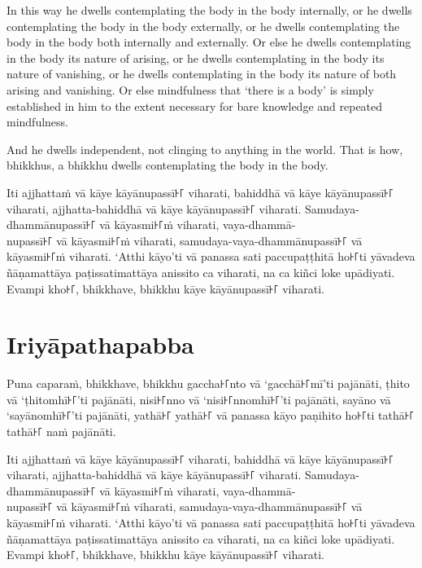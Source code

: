 In this way he dwells contemplating the body in the body internally, or he
dwells contemplating the body in the body externally, or he dwells contemplating
the body in the body both internally and externally. Or else he dwells
contemplating in the body its nature of arising, or he dwells contemplating in
the body its nature of vanishing, or he dwells contemplating in the body its
nature of both arising and vanishing. Or else mindfulness that ‘there is a body’
is simply established in him to the extent necessary for bare knowledge and
repeated mindfulness.

And he dwells independent, not clinging to anything in the world. That is how,
bhikkhus, a bhikkhu dwells contemplating the body in the body.


\paliPage

Iti ajjhattaṁ vā kāye kāyānupassī꜔꜒ viharati, bahiddhā vā kāye kāyānupassī꜔꜒
viharati, ajjhatta-bahiddhā vā kāye kāyānupassī꜔꜒ viharati. Samudaya-dhammānupassī꜔꜒
vā kāyasmi꜔꜒ṁ viharati, vaya-dhammā-\\
nupassī꜔꜒ vā kāyasmi꜔꜒ṁ viharati, samudaya-vaya-dhammānupassī꜔꜒ vā kāyasmi꜔꜒ṁ viharati.
‘Atthi kāyo’ti vā panassa sati paccupaṭṭhitā ho꜔꜒ti yāvadeva ñāṇamattāya
paṭissatimattāya anissito ca viharati, na ca kiñci loke upādiyati. Evampi kho꜔꜒,
bhikkhave, bhikkhu kāye kāyānupassī꜔꜒ viharati.


\section*{Iriyāpathapabba}

Puna caparaṁ, bhikkhave, bhikkhu gaccha꜔꜒nto vā ‘gacchā꜔꜒mī’ti pajānāti, ṭhito vā
‘ṭhitomhī꜔꜒’ti pajānāti, nisi꜔꜒nno vā ‘nisi꜔꜒nnomhī꜔꜒’ti pajānāti, sayāno vā
‘sayānomhī꜔꜒’ti pajānāti, yathā꜔꜒ yathā꜔꜒ vā panassa kāyo paṇihito ho꜔꜒ti tathā꜔꜒ tathā꜔꜒
naṁ pajānāti.

Iti ajjhattaṁ vā kāye kāyānupassī꜔꜒ viharati, bahiddhā vā kāye kāyānupassī꜔꜒
viharati, ajjhatta-bahiddhā vā kāye kāyānupassī꜔꜒ viharati. Samudaya-dhammānupassī꜔꜒
vā kāyasmi꜔꜒ṁ viharati, vaya-dhammā-\\
nupassī꜔꜒ vā kāyasmi꜔꜒ṁ viharati, samudaya-vaya-dhammānupassī꜔꜒ vā kāyasmi꜔꜒ṁ viharati.
‘Atthi kāyo’ti vā panassa sati paccupaṭṭhitā ho꜔꜒ti yāvadeva ñāṇamattāya
paṭissatimattāya anissito ca viharati, na ca kiñci loke upādiyati. Evampi kho꜔꜒,
bhikkhave, bhikkhu kāye kāyānupassī꜔꜒ viharati.

